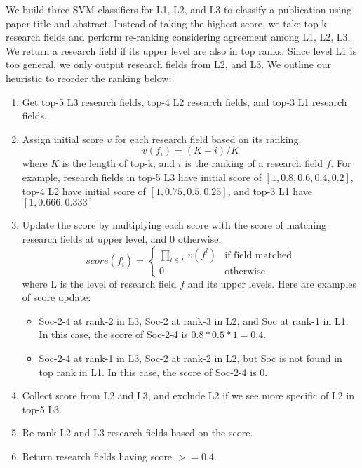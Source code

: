 We build three SVM classifiers for L1, L2, and L3 to classify a publication using paper title and abstract. Instead of taking the highest score, we take top-k research fields and perform re-ranking considering agreement among L1, L2, L3. We return a research field if its upper level are also in top ranks. Since level L1 is too general, we only output research fields from L2, and L3. We outline our heuristic to reorder the ranking below:
\begin{enumerate}
    \item Get top-5 L3 research fields, top-4 L2 research fields, and top-3 L1 research fields.
    \item Assign initial score $v$ for each research field based on its ranking.
    \begin{equation}
        v(f_i) = (K - i) / K
    \end{equation}
    where $K$ is the length of top-k, and $i$ is the ranking of a research field $f$. For example, research fields in top-5 L3 have initial score of $[1, 0.8, 0.6, 0.4, 0.2]$, top-4 L2 have initial score of $[1, 0.75, 0.5, 0.25]$, and top-3 L1 have $[1, 0.666, 0.333]$
    \item Update the score by multiplying each score with the score of matching research fields at upper level, and $0$ otherwise.
    \begin{equation}
        score(f_i^l) =
        \begin{cases}
        \prod _{l \in L} v(f^l) & \text{if field matched} \\
        0 & \text{otherwise}
        \end{cases}
    \end{equation}
    where L is the level of research field $f$ and its upper levels. Here are examples of score update:
    \begin{itemize}
        \item Soc-2-4 at rank-2 in L3, Soc-2 at rank-3 in L2, and Soc at rank-1 in L1. In this case, the score of Soc-2-4 is $0.8 * 0.5 * 1 = 0.4$.
        \item Soc-2-4 at rank-1 in L3, Soc-2 at rank-2 in L2, but Soc is not found in top rank in L1. In this case, the score of Soc-2-4 is $0$.
    \end{itemize}
    \item Collect score from L2 and L3, and exclude L2 if we see more specific of L2 in top-5 L3.
    \item Re-rank L2 and L3 research fields based on the score.
    \item Return research fields having score $>= 0.4$.
\end{enumerate}

